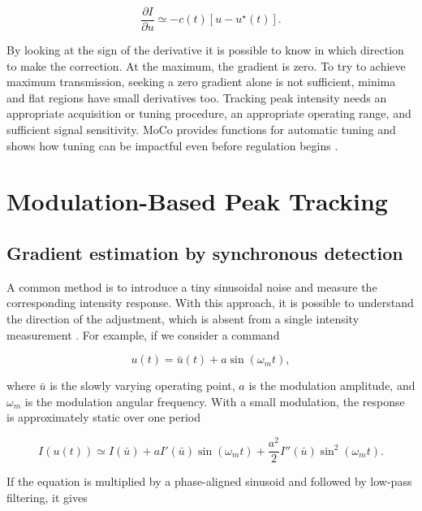 \begin{equation}
    \frac{\partial I}{\partial u}
    \simeq
    -c(t)\left[u-u^\star(t)\right].
    \label{eq:local_peak_gradient}
\end{equation}

By looking at the sign of the derivative it is possible to know in which direction to make the correction.
At the maximum, the gradient is zero.
To try to achieve maximum transmission, seeking a zero gradient alone is not sufficient, minima and flat regions have small derivatives too.
Tracking peak intensity needs an appropriate acquisition or tuning procedure, an appropriate operating
range, and sufficient signal sensitivity.
MoCo provides functions for automatic tuning and shows how tuning can be impactful even before regulation begins 
\cite{MoCo2008}.

\section{Modulation-Based Peak Tracking}

\subsection{Gradient estimation by synchronous detection}

A common method is to introduce a tiny sinusoidal noise and measure the corresponding intensity response. 
With this approach, it is possible to understand the direction of the adjustment, which is absent from a single intensity measurement
\cite{Proux2006,Stoupin2010,Zohar2016}.
For example, if we consider a command 

\begin{equation}
    u(t)=\bar{u}(t)+a\sin(\omega_m t),
    \label{eq:dither_input}
\end{equation}

where $\bar{u}$ is the slowly varying operating point, $a$ is the modulation amplitude, and $\omega_m$ is the modulation angular frequency. 
With a small modulation, the response is approximately static over one period

\begin{equation}
    I(u(t))
    \simeq
    I(\bar{u})
    +
    a I'(\bar{u})\sin(\omega_m t)
    +
    \frac{a^2}{2}I''(\bar{u})\sin^2(\omega_m t).
    \label{eq:dither_expansion}
\end{equation}

If the equation is multiplied by a phase-aligned sinusoid and followed by low-pass filtering, it gives


